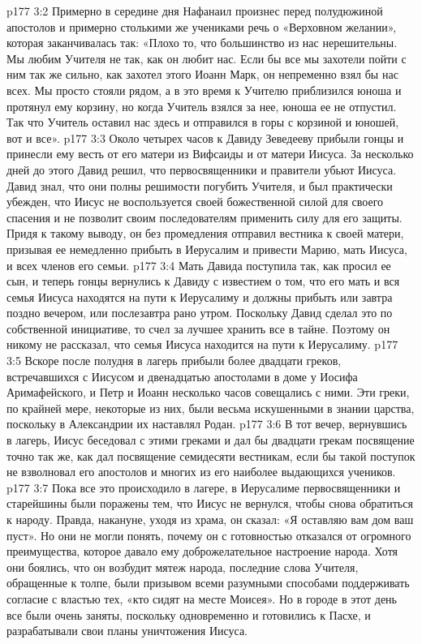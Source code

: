 \vs p177 3:2 \pc Примерно в середине дня Нафанаил произнес перед полудюжиной апостолов и примерно столькими же учениками речь о «Верховном желании», которая заканчивалась так: «Плохо то, что большинство из нас нерешительны. Мы любим Учителя не так, как он любит нас. Если бы все мы захотели пойти с ним так же сильно, как захотел этого Иоанн Марк, он непременно взял бы нас всех. Мы просто стояли рядом, а в это время к Учителю приблизился юноша и протянул ему корзину, но когда Учитель взялся за нее, юноша ее не отпустил. Так что Учитель оставил нас здесь и отправился в горы с корзиной и юношей, вот и все».
\vs p177 3:3 \pc Около четырех часов к Давиду Зеведееву прибыли гонцы и принесли ему весть от его матери из Вифсаиды и от матери Иисуса. За несколько дней до этого Давид решил, что первосвященники и правители убьют Иисуса. Давид знал, что они полны решимости погубить Учителя, и был практически убежден, что Иисус не воспользуется своей божественной силой для своего спасения и не позволит своим последователям применить силу для его защиты. Придя к такому выводу, он без промедления отправил вестника к своей матери, призывая ее немедленно прибыть в Иерусалим и привести Марию, мать Иисуса, и всех членов его семьи.
\vs p177 3:4 Мать Давида поступила так, как просил ее сын, и теперь гонцы вернулись к Давиду с известием о том, что его мать и вся семья Иисуса находятся на пути к Иерусалиму и должны прибыть или завтра поздно вечером, или послезавтра рано утром. Поскольку Давид сделал это по собственной инициативе, то счел за лучшее хранить все в тайне. Поэтому он никому не рассказал, что семья Иисуса находится на пути к Иерусалиму.
\vs p177 3:5 \pc Вскоре после полудня в лагерь прибыли более двадцати греков, встречавшихся с Иисусом и двенадцатью апостолами в доме у Иосифа Аримафейского, и Петр и Иоанн несколько часов совещались с ними. Эти греки, по крайней мере, некоторые из них, были весьма искушенными в знании царства, поскольку в Александрии их наставлял Родан.
\vs p177 3:6 В тот вечер, вернувшись в лагерь, Иисус беседовал с этими греками и дал бы двадцати грекам посвящение точно так же, как дал посвящение семидесяти вестникам, если бы такой поступок не взволновал его апостолов и многих из его наиболее выдающихся учеников.
\vs p177 3:7 \pc Пока все это происходило в лагере, в Иерусалиме первосвященники и старейшины были поражены тем, что Иисус не вернулся, чтобы снова обратиться к народу. Правда, накануне, уходя из храма, он сказал: «Я оставляю вам дом ваш пуст». Но они не могли понять, почему он с готовностью отказался от огромного преимущества, которое давало ему доброжелательное настроение народа. Хотя они боялись, что он возбудит мятеж народа, последние слова Учителя, обращенные к толпе, были призывом всеми разумными способами поддерживать согласие с властью тех, «кто сидят на месте Моисея». Но в городе в этот день все были очень заняты, поскольку одновременно и готовились к Пасхе, и разрабатывали свои планы уничтожения Иисуса.
